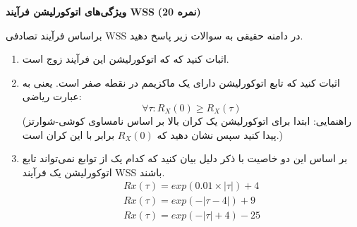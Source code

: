 \Large \textbf{ویژگی‌های اتوکورلیشن فرآیند WSS}
\large \textbf{(20 نمره)}

\normalsize \vspace{0.5cm}
براساس فرآیند تصادفی WSS در دامنه حقیقی به سوالات زیر پاسخ دهید.
\begin{enumerate}[label=(\alph*)]
	\item
اثبات کنید که که اتوکورلیشن این فرآیند زوج است.
	\item
اثبات کنید که تابع اتوکورلیشن دارای یک ماکزیمم در نقطه صفر است. یعنی به عبارت ریاضی:
$$
\forall \tau : R_{X}(0) \geqslant R_X(\tau)
$$
(راهنمایی: ابتدا برای اتوکورلیشن یک کران بالا بر اساس نامساوی کوشی-شوارتز پیدا کنید سپس نشان دهید که 
$ R_X(0) $
برابر با این کران است.)
	\item 
بر اساس این دو خاصیت با ذکر دلیل بیان کنید که کدام یک از توابع نمی‌تواند تابع اتوکورلیشن یک فرآیند WSS باشند.
$$
\begin{align*}
Rx(\tau) = exp(0.01 \times |\tau|) + 4 \\
Rx(\tau) = exp(-|\tau - 4|) + 9  \\
Rx(\tau) = exp(-|\tau| + 4) - 25 
\end{align*}
$$

\end{enumerate}


